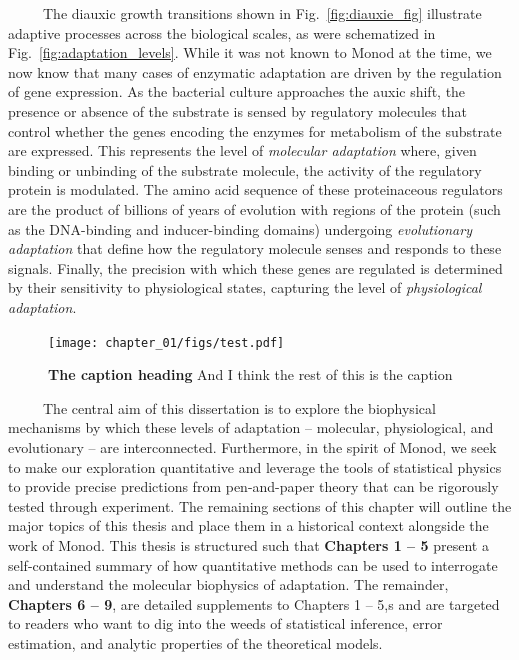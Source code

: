 \documentclass[12pt]{caltech_thesis}
\begin{document}
~~~~~The diauxic growth transitions shown in Fig.~\ref{fig:diauxie_fig}
illustrate adaptive processes across the biological scales, as were
schematized in Fig.~\ref{fig:adaptation_levels}. While it was not known
to Monod at the time, we now know that many cases of enzymatic
adaptation are driven by the regulation of gene expression. As the
bacterial culture approaches the auxic shift, the presence or absence of
the substrate is sensed by regulatory molecules that control whether the
genes encoding the enzymes for metabolism of the substrate are
expressed. This represents the level of \emph{molecular adaptation}
where, given binding or unbinding of the substrate molecule, the
activity of the regulatory protein is modulated. The amino acid sequence
of these proteinaceous regulators are the product of billions of years
of evolution with regions of the protein (such as the DNA-binding and
inducer-binding domains) undergoing \emph{evolutionary adaptation} that
define how the regulatory molecule senses and responds to these signals.
Finally, the precision with which these genes are regulated is
determined by their sensitivity to physiological states, capturing the
level of \emph{physiological adaptation}.

\hypertarget{fig:custom_second_figure}{%
\begin{figure}
\centering
\texttt{[image: chapter\_01/figs/test.pdf]}
\caption[{The second first caption.}]{\textbf{The caption heading} And I
think the rest of this is the caption}
\label{fig:custom_second_figure}
\end{figure}
}

~~~~~The central aim of this dissertation is to explore the biophysical
mechanisms by which these levels of adaptation -- molecular,
physiological, and evolutionary -- are interconnected. Furthermore, in
the spirit of Monod, we seek to make our exploration quantitative and
leverage the tools of statistical physics to provide precise predictions
from pen-and-paper theory that can be rigorously tested through
experiment. The remaining sections of this chapter will outline the
major topics of this thesis and place them in a historical context
alongside the work of Monod. This thesis is structured such that
\textbf{Chapters 1 -- 5} present a self-contained summary of how
quantitative methods can be used to interrogate and understand the
molecular biophysics of adaptation. The remainder, \textbf{Chapters 6 --
9}, are detailed supplements to Chapters 1 -- 5,s and are targeted to
readers who want to dig into the weeds of statistical inference, error
estimation, and analytic properties of the theoretical models.
\end{document}
